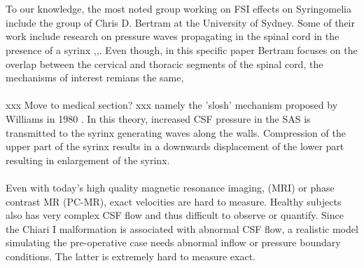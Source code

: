 \\
\\
To our knowledge, the most noted group working on FSI effects on Syringomelia include the group of Chris D. Bertram at the University of Sydney. Some of their work include research on pressure waves propagating in the spinal cord in the presence of a syrinx \cite{Bert05},\cite{Bert08},\cite{Bert09}. Even though, in this specific paper Bertram focuses on the overlap between the cervical and thoracic segments of the spinal cord, the mechanisms of interest remians the same,
\\
\\
xxx Move to medical section? xxx namely the 'slosh' mechanism proposed by Williams in 1980 \cite{Will80}. In this theory, increased CSF pressure in the SAS is transmitted to the syrinx generating waves along the walls. Compression of the upper part of the syrinx results in a downwards displacement of the lower part resulting in enlargement of the syrinx. 
\\
\\
Even with today's high quality magnetic resonance imaging, (MRI) or phase contrast MR (PC-MR), exact velocities are hard to measure. Healthy subjects also has very complex CSF flow and thus difficult to observe or quantify. Since the Chiari I malformation is associated with abnormal CSF flow, a realistic model simulating the pre-operative case needs abnormal inflow or pressure boundary conditions. The latter is extremely hard to measure exact. 


